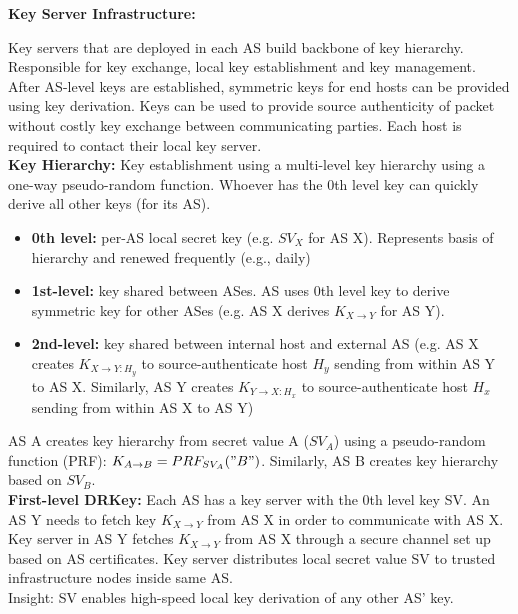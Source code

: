 \documentclass[11pt,oneside,a4paper]{article}
\begin{document}
\textbf{Key Server Infrastructure:}

Key servers that are deployed in each AS build backbone of key hierarchy. Responsible for key exchange, local key establishment and key management. After AS-level keys are established, symmetric keys for end hosts can be provided using key derivation. Keys can be used to provide source authenticity of packet without costly key exchange between communicating parties. Each host is required to contact their local key server.\\

\textbf{Key Hierarchy:} Key establishment using a multi-level key hierarchy using a one-way pseudo-random function. Whoever has the 0th level key can quickly derive all other keys (for its AS).

\vspace{-\topsep}
\begin{itemize}
	\setlength{\itemsep}{0pt}
	\setlength{\parskip}{0pt}
	\item \textbf{0th level:} per-AS local secret key (e.g. $SV_X$ for AS X). Represents basis of hierarchy and renewed frequently (e.g., daily)
	\item \textbf{1st-level:} key shared between ASes. AS uses 0th level key to derive symmetric key for other ASes (e.g. AS X derives $K_{X\rightarrow Y}$ for AS Y).
	\item \textbf{2nd-level:} key shared between internal host and external AS (e.g. AS X creates $K_{X\rightarrow Y:H_y}$ to source-authenticate host $H_y$ sending from within AS Y to AS X. Similarly, AS Y creates $K_{Y\rightarrow X:H_x}$ to source-authenticate host $H_x$ sending from within AS X to AS Y)
\end{itemize}
\vspace{-\topsep}

AS A creates key hierarchy from secret value A ($SV_A$) using a pseudo-random function (PRF): $K_{A\rightarrow B} = PRF_{SV_A}("B")$. Similarly, AS B creates key hierarchy based on $SV_B$.\\

\textbf{First-level DRKey:} Each AS has a key server with the 0th level key SV. An AS Y needs to fetch key $K_{X\rightarrow Y}$ from AS X in order to communicate with AS X. Key server in AS Y fetches $K_{X\rightarrow Y}$ from AS X through a secure channel set up based on AS certificates. Key server distributes local secret value SV to trusted infrastructure nodes inside same AS.\\
Insight: SV enables high-speed local key derivation of any other AS’ key.
\end{document}
